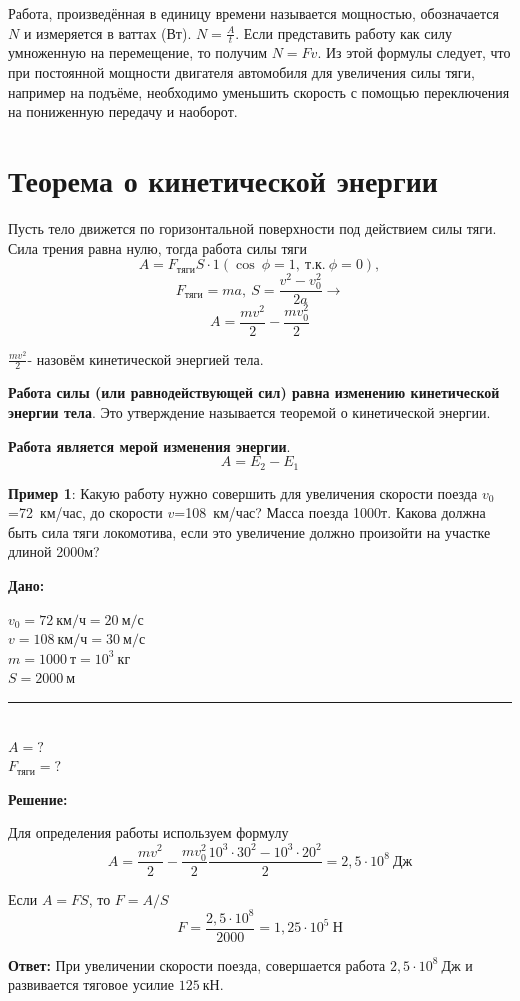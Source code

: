 \documentclass[a6paper, 11pt]{diss_4}
\renewcommand{\'}{\,'}
\begin{document}
  Работа, произведённая в единицу времени называется мощностью, обозначается
$N$ и измеряется в ваттах (Вт). $N=\frac{A}{t}$. Если представить работу как
силу умноженную на перемещение, то получим $N=Fv$. Из этой формулы следует,
что при постоянной мощности двигателя автомобиля для увеличения силы тяги,
например на подъёме, необходимо уменьшить скорость с помощью переключения на
пониженную передачу и наоборот.


\section{Теорема о кинетической энергии}

  Пусть тело движется по горизонтальной поверхности под действием силы
тяги. Сила трения равна нулю, тогда работа силы тяги
\[
A=F_{тяги}S\cdot1(\cos\ \phi=1,\ т.к.\ \phi=0),
\]
\[
F_{тяги}=ma,\ S=\frac{v^2-v^2_0}{2a}\to
\]
\[
A=\frac{mv^2}{2}-\frac{mv^2_0}{2}
\]

 $\frac{mv^2}{2}$- назовём кинетической энергией тела.

  \textbf{Работа силы (или равнодействующей сил) равна изменению кинетической
энергии тела}. Это утверждение называется теоремой о кинетической энергии.

 \textbf{Работа является мерой изменения энергии}.
\[
A=E_2-E_1
\]

  \textbf{Пример 1}: Какую работу нужно совершить для увеличения скорости
поезда $v_0$=72\ км/час, до скорости $v$=108\ км/час? Масса поезда 1000т. Какова
должна быть сила тяги локомотива, если это увеличение должно произойти на
участке длиной 2000м?

\hspace{1cm}\textbf{Дано:}\hspace{.3cm}
\parbox[t]{4,3cm}{
$v_0=72\ км/ч=20\ м/с$\\
$v=108\ км/ч=30\ м/с$\\
$m=1000\ т=10^3\ кг$\\
$S=2000\ м$\\
\rule{4cm}{.4pt}\\
$A=?$\\
$F_{тяги}=?$
}

 \textbf{Решение:}

Для определения работы используем формулу
\[
A=\frac{mv^2}{2}-\frac{mv^2_0}{2}\frac{10^3\cdot30^2-10^3\cdot20^2}{2}=
2,5\cdot10^8\ Дж
\]

Если $A=FS$, то $F=A/S$
\[
F=\frac{2,5\cdot10^8}{2000}=1,25\cdot10^5\ Н
\]

  \textbf{Ответ:} При увеличении скорости поезда, совершается работа
$2,5\cdot10^8\ Дж$ и развивается тяговое усилие $125\ кН$.
\end{document}

